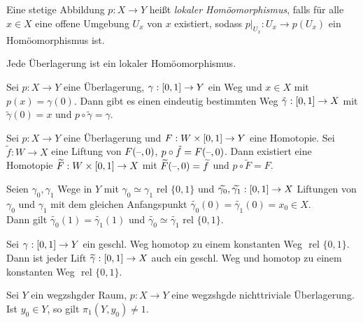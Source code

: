\documentclass{cheat-sheet}
\newcommand{\rel}{\text{ rel }} %
\begin{document}
\begin{defn}
  Eine stetige Abbildung $p : X \to Y$ heißt \emph{lokaler Homöomorphismus}, falls für alle $x \in X$ eine offene Umgebung $U_x$ von $x$ existiert, sodass $p|_{U_x} : U_x \to p(U_x)$ ein Homöomorphismus ist.
\end{defn}

\begin{lem}
  Jede Überlagerung ist ein lokaler Homöomorphismus.
\end{lem}

\begin{prop}
  Sei $p : X \to Y$ eine Überlagerung, $\gamma : \left[ 0, 1 \right] \to Y$ ein Weg und $x \in X$ mit $p(x) = \gamma(0)$. Dann gibt es einen eindeutig bestimmten Weg $\tilde{\gamma} : \left[ 0, 1 \right] \to X$ mit $\tilde{\gamma}(0) = x$ und $p \circ \tilde{\gamma} = \gamma$.
\end{prop}


\begin{satz}
  Sei $p \!:\! X \!\to\! Y$ eine Überlagerung und $F : W \times \left[ 0, 1 \right] \to Y$ eine Homotopie. Sei $\tilde{f} : W \to X$ eine Liftung von $F(\text{--}, 0)$, \dh{} $p \circ \tilde{f} = F(\text{--}, 0)$. Dann existiert eine Homotopie $\widetilde{F} : W \times \left[ 0, 1 \right] \to X$ mit $\widetilde{F}(\text{--}, 0) = \widetilde{f}$ und $p \circ \widetilde{F} = F$.
\end{satz}

\begin{kor}
  Seien $\gamma_0, \gamma_1$ Wege in $Y$ mit $\gamma_0 \simeq \gamma_1 \rel \{ 0, 1 \}$ und $\widetilde{\gamma_0}, \widetilde{\gamma_1} : \left[ 0, 1 \right] \to X$ Liftungen von $\gamma_0$ und $\gamma_1$ mit dem gleichen Anfangspunkt $\widetilde{\gamma_0}(0) = \widetilde{\gamma_1}(0) = x_0 \in X$. \\
  Dann gilt $\widetilde{\gamma_0}(1) = \widetilde{\gamma_1}(1)$ und $\widetilde{\gamma_0} \simeq \widetilde{\gamma_1} \rel \{ 0, 1 \}$.
\end{kor}

\begin{kor}
  Sei $\gamma : \left[ 0, 1 \right] \to Y$ ein geschl. Weg homotop zu einem konstanten Weg $\rel \{ 0, 1 \}$. Dann ist jeder Lift $\widetilde{\gamma} : \left[ 0, 1 \right] \to X$ auch ein geschl. Weg und homotop zu einem konstanten Weg $\rel \{ 0, 1 \}$.
\end{kor}

\begin{kor}
  Sei $Y$ ein wegzshgder Raum, $p : X \to Y$ eine wegzshgde nichttriviale Überlagerung. Ist $y_0 \in Y$, so gilt $\pi_1(Y, y_0) \not= 1$.
\end{kor}
\end{document}
